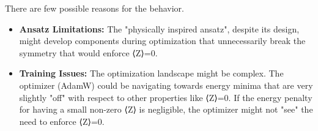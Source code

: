 \documentclass[a4paper]{article}
\begin{document}
There are few possible reasons for the behavior.
\begin{itemize}
    \item \textbf{Ansatz Limitations:} The "physically inspired ansatz", despite its design, might develop components during optimization that unnecessarily break the symmetry that would enforce ⟨Z⟩=0.
    \item \textbf{Training Issues:} The optimization landscape might be complex. The optimizer (AdamW) could be navigating towards energy minima that are very slightly "off" with respect to other properties like ⟨Z⟩=0. If the energy penalty for having a small non-zero ⟨Z⟩ is negligible, the optimizer might not "see" the need to enforce ⟨Z⟩=0.
\end{itemize}
\end{document}
